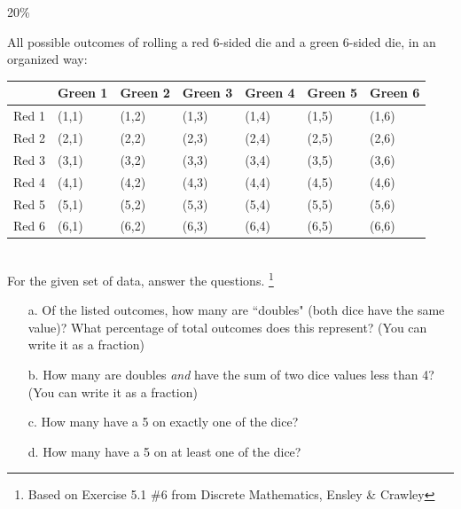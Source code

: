 \documentclass[a4paper,12pt]{book}
\begin{document}
        \begin{question}{5}{20\%}

            All possible outcomes of rolling a red 6-sided die and a green 6-sided die,
            in an organized way: ~\\

            \begin{tabular}{ l | l l l l l l }
                & Green 1 & Green 2 & Green 3 & Green 4 & Green 5 & Green 6 \\ \hline
                Red 1 & (1,1) & (1,2) & (1,3) & (1,4) & (1,5) & (1,6) \\
                Red 2 & (2,1) & (2,2) & (2,3) & (2,4) & (2,5) & (2,6) \\
                Red 3 & (3,1) & (3,2) & (3,3) & (3,4) & (3,5) & (3,6) \\
                Red 4 & (4,1) & (4,2) & (4,3) & (4,4) & (4,5) & (4,6) \\
                Red 5 & (5,1) & (5,2) & (5,3) & (5,4) & (5,5) & (5,6) \\
                Red 6 & (6,1) & (6,2) & (6,3) & (6,4) & (6,5) & (6,6) \\
                
            \end{tabular}
            ~\\

            For the given set of data, answer the questions.
            \footnote{Based on Exercise 5.1 \#6 from Discrete Mathematics, Ensley \& Crawley}

            \begin{enumerate}
                \item[a.] Of the listed outcomes, how many are ``doubles"
                    (both dice have the same value)? What percentage of
                    total outcomes does this represent?
                    (You can write it as a fraction)

                \item[b.] How many are doubles \textit{and} have the sum
                of two dice values less than 4?
                    (You can write it as a fraction)

                \item[c.] How many have a 5 on exactly one of the dice?

                \item[d.] How many have a 5 on at least one of the dice?
            \end{enumerate}
            
        \end{question}
                
\end{document}

